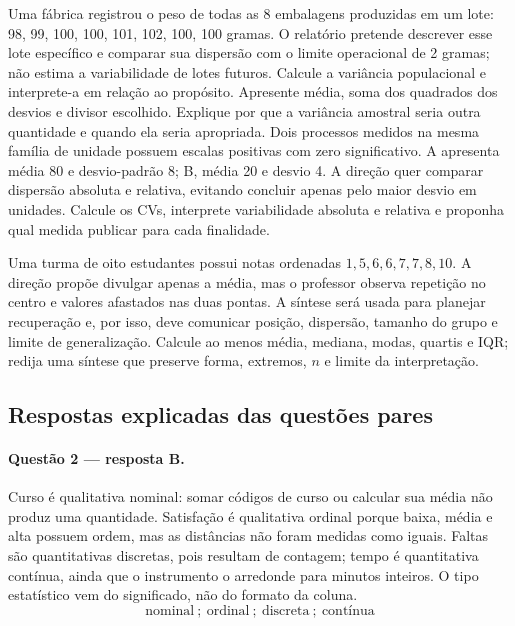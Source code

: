 \TextoBase Uma fábrica registrou o peso de todas as 8 embalagens produzidas em um lote: 98, 99, 100, 100, 101, 102, 100, 100 gramas. O relatório pretende descrever esse lote específico e comparar sua dispersão com o limite operacional de 2 gramas; não estima a variabilidade de lotes futuros.
\FonteDidatica
\Comando Calcule a variância populacional e interprete-a em relação ao propósito. Apresente média, soma dos quadrados dos desvios e divisor escolhido. Explique por que a variância amostral seria outra quantidade e quando ela seria apropriada.
\TextoBase Dois processos medidos na mesma família de unidade possuem escalas positivas com zero significativo. A apresenta média 80 e desvio-padrão 8; B, média 20 e desvio 4. A direção quer comparar dispersão absoluta e relativa, evitando concluir apenas pelo maior desvio em unidades.
\FonteDidatica
\Comando Calcule os CVs, interprete variabilidade absoluta e relativa e proponha qual medida publicar para cada finalidade.

\TextoBase Uma turma de oito estudantes possui notas ordenadas $1,5,6,6,7,7,8,10$. A direção propõe divulgar apenas a média, mas o professor observa repetição no centro e valores afastados nas duas pontas. A síntese será usada para planejar recuperação e, por isso, deve comunicar posição, dispersão, tamanho do grupo e limite de generalização.
\FonteDidatica
\Comando Calcule ao menos média, mediana, modas, quartis e IQR; redija uma síntese que preserve forma, extremos, $n$ e limite da interpretação.

\newpage\subsection{Respostas explicadas das questões pares}
\paragraph{Questão 2 — resposta B.} Curso é qualitativa nominal: somar códigos de curso ou calcular sua média não produz uma quantidade. Satisfação é qualitativa ordinal porque baixa, média e alta possuem ordem, mas as distâncias não foram medidas como iguais. Faltas são quantitativas discretas, pois resultam de contagem; tempo é quantitativa contínua, ainda que o instrumento o arredonde para minutos inteiros. O tipo estatístico vem do significado, não do formato da coluna.
\[\text{nominal}\ ;\ \text{ordinal}\ ;\ \text{discreta}\ ;\ \text{contínua}\]

